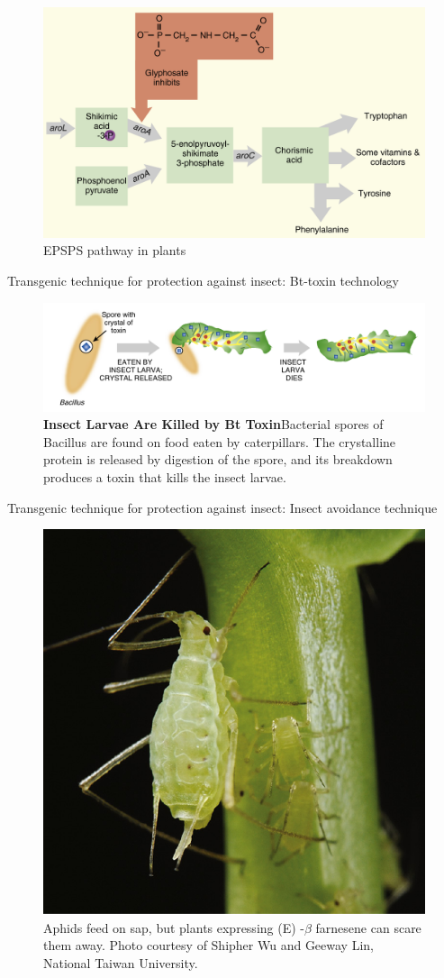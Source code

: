 \documentclass[
  ignorenonframetext,
  aspectratio=169]{beamer}
\begin{document}
\begin{frame}{}
\protect\hypertarget{section-1}{}
\begin{figure}
\includegraphics[width=0.5\linewidth]{../images/epsps_pathway_plants} \caption{EPSPS pathway in plants}\label{fig:glyphosate-tolerance}
\end{figure}
\end{frame}

\begin{frame}{Transgenic technique for protection against insect:
Bt-toxin technology}
\protect\hypertarget{transgenic-technique-for-protection-against-insect-bt-toxin-technology}{}
\begin{figure}
\includegraphics[width=0.6\linewidth]{../images/bt_toxin_mechanism} \caption{\textbf{Insect Larvae Are Killed by Bt Toxin}Bacterial spores of Bacillus are found on food eaten by caterpillars. The crystalline protein is released by digestion of the spore, and its breakdown produces a toxin that kills the insect larvae.}\label{fig:bt-toxin-mechanism}
\end{figure}
\end{frame}

\begin{frame}{Transgenic technique for protection against insect: Insect
avoidance technique}
\protect\hypertarget{transgenic-technique-for-protection-against-insect-insect-avoidance-technique}{}
\begin{figure}
\includegraphics[width=0.4\linewidth]{../images/aphid_avoidance} \caption{Aphids feed on sap, but plants expressing (E) -$\beta$ farnesene can scare them away. Photo courtesy of Shipher Wu and Geeway Lin, National Taiwan University.}\label{fig:aphid-avoidance}
\end{figure}
\end{frame}
\end{document}
